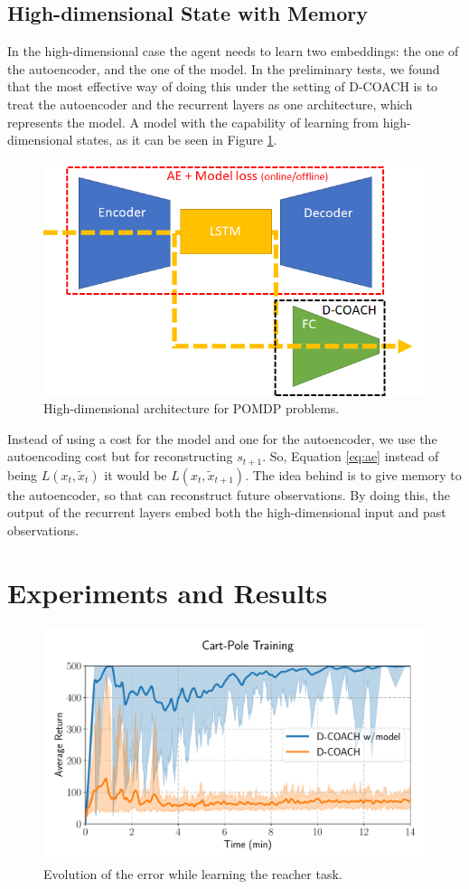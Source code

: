 \subsection{High-dimensional State with Memory}
In the high-dimensional case the agent needs to learn two embeddings: the one of the autoencoder, and the one of the model. In the preliminary tests, we found that the most effective way of doing this under the setting of D-COACH is to treat the autoencoder and the recurrent layers as one architecture, which represents the model. A model with the capability of learning from high-dimensional states, as it can be seen in Figure \ref{fig:rnn_hd}. 

\begin{figure}[h]
    \centering
    \includegraphics[width=0.6\linewidth]{imagenes/cap4/RNN_HD.png}
    \caption{High-dimensional architecture for POMDP problems.}
    \label{fig:rnn_hd}
\end{figure}

Instead of using a cost for the model and one for the autoencoder, we use the autoencoding cost but for reconstructing $s_{t+1}$. So, Equation \ref{eq:ae} instead of being $L(x_{t},\widetilde x_{t})$ it would be  $L(x_{t},\widetilde x_{t+1})$. The idea behind is to give memory to the autoencoder, so that can reconstruct future observations. By doing this, the output of the recurrent layers embed both the high-dimensional input and past observations.

\section{Experiments and Results}

\begin{figure}[h]
    \centering
    \includegraphics[width=0.9\linewidth]{imagenes/cap3/cartpole_LD_model.pdf}
    \caption{Evolution of the error while learning the reacher task. }
    \label{fig:reacher_exp}
\end{figure}

